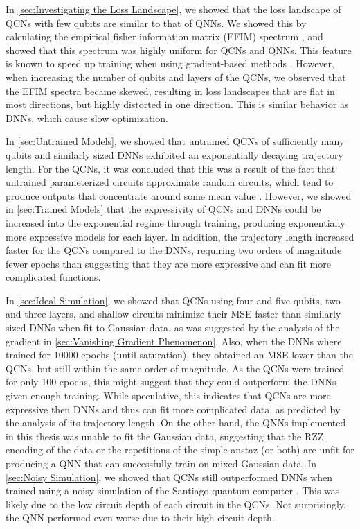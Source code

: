 In \cref{sec:Investigating the Loss Landscape}, we showed that the loss landscape of QCNs with few qubits are similar to that of QNNs. We showed this by calculating the empirical fisher information matrix (EFIM) spectrum \cite{karakida2019universal}, and showed that this spectrum was highly uniform for QCNs and QNNs. This feature is known to speed up training when using gradient-based methods \cite{karakida2019universal}. However, when increasing the number of qubits and layers of the QCNs, we observed that the EFIM spectra became skewed, resulting in loss landscapes that are flat in most directions, but highly distorted in one direction. This is similar behavior as DNNs, which cause slow optimization.

In \cref{sec:Untrained Models}, we showed that untrained QCNs of sufficiently many qubits and similarly sized DNNs exhibited an exponentially decaying trajectory length. For the QCNs, it was concluded that this was a result of the fact that untrained parameterized circuits approximate random circuits, which tend to produce outputs that concentrate around some mean value \cite{McClean_2018}. However, we showed in \cref{sec:Trained Models} that the expressivity of QCNs and DNNs could be increased into the exponential regime through training, producing exponentially more expressive models for each layer. In addition, the trajectory length increased faster for the QCNs compared to the DNNs, requiring two orders of magnitude fewer epochs than  suggesting that they are more expressive and can fit more complicated functions.

In \cref{sec:Ideal Simulation}, we showed that QCNs using four and five qubits, two and three layers, and shallow circuits minimize their MSE faster than similarly sized DNNs when fit to Gaussian data, as was suggested by the analysis of the gradient in \cref{sec:Vanishing Gradient Phenomenon}. Also, when the DNNs where trained for 10000 epochs (until saturation), they obtained an MSE lower than the QCNs, but still within the same order of magnitude. As the QCNs were trained for only 100 epochs, this might suggest that they could outperform the DNNs given enough training. While speculative, this indicates that QCNs are more expressive then DNNs and thus can fit more complicated data, as predicted by the analysis of its trajectory length. On the other hand, the QNNs implemented in this thesis was unable to fit the Gaussian data, suggesting that the RZZ encoding of the data or the repetitions of the simple anstaz (or both) are unfit for producing a QNN that can successfully train on mixed Gaussian data. In \cref{sec:Noisy Simulation}, we showed that QCNs still outperformed DNNs when trained using a noisy simulation of the Santiago quantum computer \cite{santiago}. This was likely due to the low circuit depth of each circuit in the QCNs. Not surprisingly, the QNN performed even worse due to their high circuit depth.   

